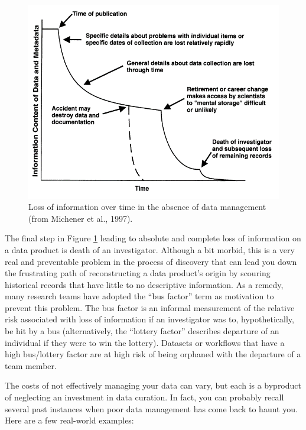 \documentclass[
]{book}
\begin{document}
\begin{figure}

{\centering \includegraphics[width=1\linewidth]{img/michener} 

}

\caption{Loss of information over time in the absence of data management (from Michener et al., 1997).}\label{fig:michener}
\end{figure}

The final step in Figure \ref{fig:michener} leading to absolute and complete loss of information on a data product is death of an investigator. Although a bit morbid, this is a very real and preventable problem in the process of discovery that can lead you down the frustrating path of reconstructing a data product's origin by scouring historical records that have little to no descriptive information. As a remedy, many research teams have adopted the ``bus factor'' term as motivation to prevent this problem. The bus factor is an informal measurement of the relative risk associated with loss of information if an investigator was to, hypothetically, be hit by a bus (alternatively, the ``lottery factor'' describes departure of an individual if they were to win the lottery). Datasets or workflows that have a high bus/lottery factor are at high risk of being orphaned with the departure of a team member.

The costs of not effectively managing your data can vary, but each is a byproduct of neglecting an investment in data curation. In fact, you can probably recall several past instances when poor data management has come back to haunt you. Here are a few real-world examples:
\end{document}
